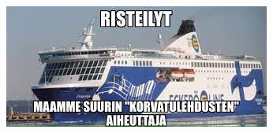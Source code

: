 \documentclass[10pt, a4paper]{article}
\begin{document}
\begin{multicols}{2}
\begin{flushleft}
\columnbreak


\vspace{0.2cm}

\pagebreak



\vspace{-0.4cm}





%

\pagebreak





\columnbreak



\pagebreak





\includegraphics[scale=0.6]{kuvat/siljameemi.png}

\columnbreak


\vspace*{1.2cm}




\columnbreak
 





\pagebreak









\end{flushleft}
\end{multicols}
\end{document}

